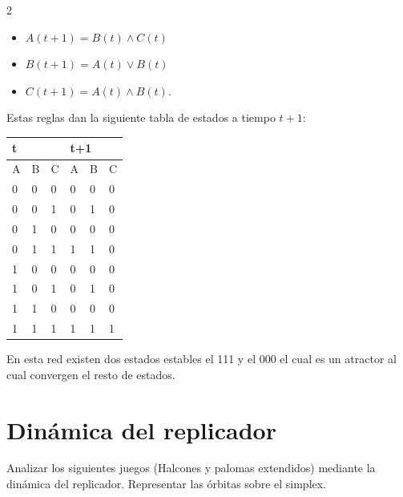 \documentclass[spanish, 12pt, a4paper]{article}
\begin{document}
\begin{multicols}{2}
\begin{itemize}
    \item $A(t+1) = B(t) \land C(t)$
    \item $B(t+1) = A(t) \lor B(t)$
    \item $C(t+1) = A(t) \land B(t)$.
\end{itemize}

Estas reglas dan la siguiente tabla de estados a tiempo $t+1$:

\begin{table}[H]
    \begin{tabular}{|lll|lll|}
    \hline
    \multicolumn{3}{|l|}{t}                              & \multicolumn{3}{l|}{t+1}                            \\ \hline
    \multicolumn{1}{|l|}{A} & \multicolumn{1}{l|}{B} & C & \multicolumn{1}{l|}{A} & \multicolumn{1}{l|}{B} & C \\ \hline
    \multicolumn{1}{|l|}{0} & \multicolumn{1}{l|}{0} & 0 & \multicolumn{1}{l|}{0} & \multicolumn{1}{l|}{0} & 0 \\ \hline
    \multicolumn{1}{|l|}{0} & \multicolumn{1}{l|}{0} & 1 & \multicolumn{1}{l|}{0} & \multicolumn{1}{l|}{1} & 0 \\ \hline
    \multicolumn{1}{|l|}{0} & \multicolumn{1}{l|}{1} & 0 & \multicolumn{1}{l|}{0} & \multicolumn{1}{l|}{0} & 0 \\ \hline
    \multicolumn{1}{|l|}{0} & \multicolumn{1}{l|}{1} & 1 & \multicolumn{1}{l|}{1} & \multicolumn{1}{l|}{1} & 0 \\ \hline
    \multicolumn{1}{|l|}{1} & \multicolumn{1}{l|}{0} & 0 & \multicolumn{1}{l|}{0} & \multicolumn{1}{l|}{0} & 0 \\ \hline
    \multicolumn{1}{|l|}{1} & \multicolumn{1}{l|}{0} & 1 & \multicolumn{1}{l|}{0} & \multicolumn{1}{l|}{1} & 0 \\ \hline
    \multicolumn{1}{|l|}{1} & \multicolumn{1}{l|}{1} & 0 & \multicolumn{1}{l|}{0} & \multicolumn{1}{l|}{0} & 0 \\ \hline
    \multicolumn{1}{|l|}{1} & \multicolumn{1}{l|}{1} & 1 & \multicolumn{1}{l|}{1} & \multicolumn{1}{l|}{1} & 1 \\ \hline
    \end{tabular}
\end{table}


En esta red existen dos estados estables el 111 y el 000 el cual es un atractor al cual convergen el resto de estados.

\section{Dinámica del replicador}
Analizar los siguientes juegos (Halcones y palomas extendidos) mediante la dinámica del replicador. Representar las órbitas sobre el simplex.


\end{multicols}
\end{document}
